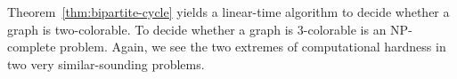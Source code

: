 Theorem~\ref{thm:bipartite-cycle} yields a linear-time algorithm to decide whether a graph is two-colorable. 
To decide whether a graph is \(3\)-colorable is an NP-complete problem. 
Again, we see the two extremes of computational hardness in two very similar-sounding problems.














\renewcommand{\emph}[1]{\textcolor{black}{#1}}
\printbibliography[heading=bibintoc,title={References}]



